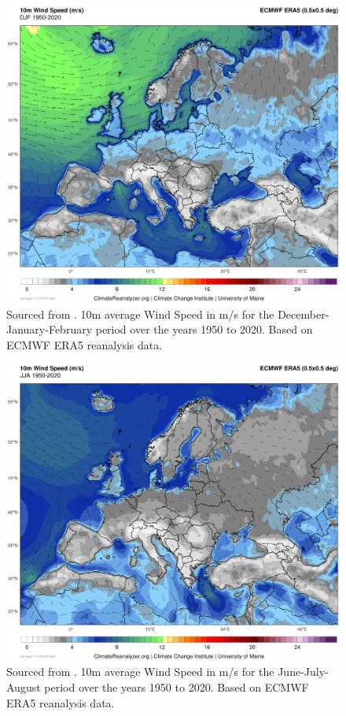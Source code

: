         \begin{figure}
            \centering
            \includegraphics[width=\textwidth]{figures/era5-0p5deg_68.png}
            \caption{Sourced from \cite{ClimateReanalyzer2023}. 10m average Wind Speed in m/s for the December-January-February period over the years 1950 to 2020. Based on ECMWF ERA5 reanalysis data.}
            \label{fig:CR_10m_wind_DJF}
        \end{figure}
    
        \begin{figure}
            \centering
            \includegraphics[width=\textwidth]{figures/era5-0p5deg_26.png}
            \caption{Sourced from \cite{ClimateReanalyzer2023}. 10m average Wind Speed in m/s for the June-July-August period over the years 1950 to 2020. Based on ECMWF ERA5 reanalysis data.}
            \label{fig:CR_10m_wind_JJA}
        \end{figure}
    
